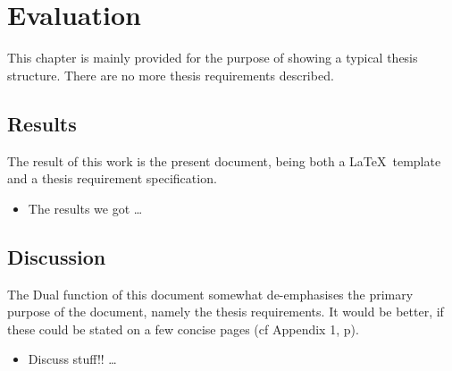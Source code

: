 \chapter{Evaluation}\label{ch:eval}

This chapter is mainly provided for the purpose of showing a typical thesis
structure.  There are no more thesis requirements described.

\section{Results}

The result of this work is the present document, being both a \LaTeX\
template and a thesis requirement specification.

\begin{itemize}
  \item The results we got
\ldots
\end{itemize}

\section{Discussion}

The Dual function of this document somewhat de-emphasises the primary
purpose of the document, namely the thesis requirements.  It would be
better, if these could be stated on a few concise pages (cf Appendix
1, p\pageref{app1}).

\begin{itemize}
  \item Discuss stuff!!
\ldots
\end{itemize}
